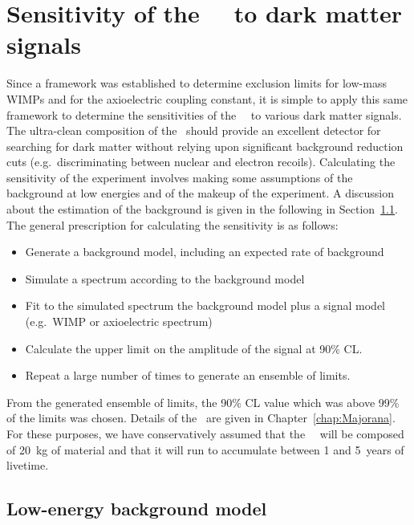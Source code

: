 	\section{Sensitivity of the \MJ~\minmod~to dark matter signals}
	\label{sec:MJSensitivity}
	
	Since a framework was established to determine exclusion limits for low-mass WIMPs and for the axioelectric coupling constant, it is simple to apply this same framework to determine the sensitivities of the \MJ~\minmod~to various dark matter signals.  The ultra-clean composition of the \minmod~should provide an excellent detector for searching for dark matter without relying upon significant background reduction cuts (e.g.~discriminating between nuclear and electron recoils).  Calculating the sensitivity of the experiment involves making some assumptions of the background at low energies and of the makeup of the experiment.  A discussion about the estimation of the background is given in the following in Section~\ref{sec:MJLowEnergyBackgroundModel}.  The general prescription for calculating the sensitivity is as follows:
	
		\begin{itemize}
			\item Generate a background model, including an expected rate of background
			\item Simulate a spectrum according to the background model
			\item Fit to the simulated spectrum the background model plus a signal model (e.g.~WIMP or axioelectric spectrum)
			\item Calculate the upper limit on the amplitude of the signal at 90\% CL.
			\item Repeat a large number of times to generate an ensemble of limits.
		\end{itemize}	
From the generated ensemble of limits, the 90\% CL value which was above 99\% of the limits was chosen.  Details of the \MJ~\minmod are given in Chapter~\ref{chap:Majorana}.  For these purposes, we have conservatively assumed that the \MJ~\minmod~will be composed of 20~kg of material and that it will run to accumulate between 1 and 5~years of livetime.  
	
		\subsection{Low-energy background model}
		\label{sec:MJLowEnergyBackgroundModel}
		
